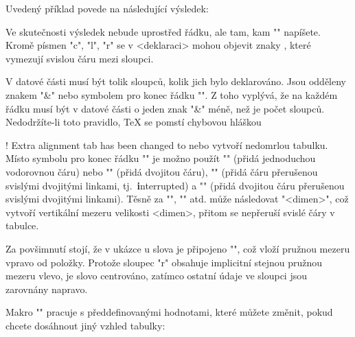 \begtt
{}
\endtt

Uvedený příklad povede na následující výsledek:

\medskip
\hfil{}
\medskip

Ve skutečnosti výsledek nebude uprostřed řádku, ale tam, kam "\table"
napíšete. Kromě písmen "c", "l", "r" se v <deklaraci> mohou objevit znaky
, které vymezují svislou čáru mezi sloupci. 

V datové části musí být tolik sloupců, kolik jich bylo deklarováno.
Jsou odděleny znakem "&" nebo symbolem pro konec řádku "\cr". Z toho vyplývá,
že na každém řádku musí být v datové části o jeden znak "&" méně, než je počet sloupců.
Nedodržíte-li toto pravidlo, \TeX{} se pomstí chybovou hláškou

\begtt
! Extra alignment tab has been changed to \cr
\endtt  
%
nebo vytvoří nedomrlou tabulku. Místo symbolu pro konec řádku "\cr" je možno
použít "\crl" (přidá jednoduchou vodorovnou čáru) nebo "\crll" (přidá dvojitou
čáru), "\crli" (přidá čáru přerušenou svislými dvojitými linkami, 
tj.~{\bf i}nterrupted) a 
"\crlli" (přidá dvojitou čáru přerušenou svislými dvojitými linkami).
Těsně za "\cr", "\crl" atd. může následovat "\tskip<dimen>",
což vytvoří vertikální mezeru velikosti <dimen>, přitom se nepřeruší svislé
čáry v tabulce.

Za povšimnutí stojí, že v ukázce u slova  je připojeno
"\hfil", což vloží pružnou mezeru vpravo od položky. Protože sloupec "r"
obsahuje implicitní stejnou pružnou mezeru vlevo, je slovo  centrováno, 
zatímco ostatní údaje ve sloupci jsou zarovnány
napravo. 

Makro "\table" pracuje s předdefinovanými hodnotami, které můžete změnit,
pokud chcete dosáhnout jiný vzhled tabulky:

\begtt
\def\tabiteml{\enspace} %
\def\tabitemr{\enspace} %
\def\tabstrut{\strut}   %
\def\vvkern{1pt}   %
\def\hhkern{1pt}   %
\endtt

